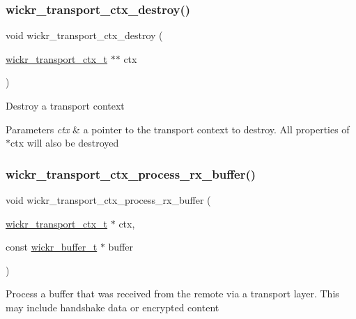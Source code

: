 \subsubsection{\texorpdfstring{wickr\+\_\+transport\+\_\+ctx\+\_\+destroy()}{wickr\_transport\_ctx\_destroy()}}
{\footnotesize\ttfamily void wickr\+\_\+transport\+\_\+ctx\+\_\+destroy (\begin{DoxyParamCaption}\item[{\hyperlink{structwickr__transport__ctx}{wickr\+\_\+transport\+\_\+ctx\+\_\+t} $\ast$$\ast$}]{ctx }\end{DoxyParamCaption})}

Destroy a transport context


\begin{DoxyParams}{Parameters}
{\em ctx} & a pointer to the transport context to destroy. All properties of \textquotesingle{}$\ast$ctx\textquotesingle{} will also be destroyed \\
\hline
\end{DoxyParams}
\mbox{\label{group__wickr__transport__ctx_gad982fd3463a81a667592e18d7bf90822}} 
\subsubsection{\texorpdfstring{wickr\+\_\+transport\+\_\+ctx\+\_\+process\+\_\+rx\+\_\+buffer()}{wickr\_transport\_ctx\_process\_rx\_buffer()}}
{\footnotesize\ttfamily void wickr\+\_\+transport\+\_\+ctx\+\_\+process\+\_\+rx\+\_\+buffer (\begin{DoxyParamCaption}\item[{\hyperlink{structwickr__transport__ctx}{wickr\+\_\+transport\+\_\+ctx\+\_\+t} $\ast$}]{ctx,  }\item[{const \hyperlink{structwickr__buffer}{wickr\+\_\+buffer\+\_\+t} $\ast$}]{buffer }\end{DoxyParamCaption})}

Process a buffer that was received from the remote via a transport layer. This may include handshake data or encrypted content


